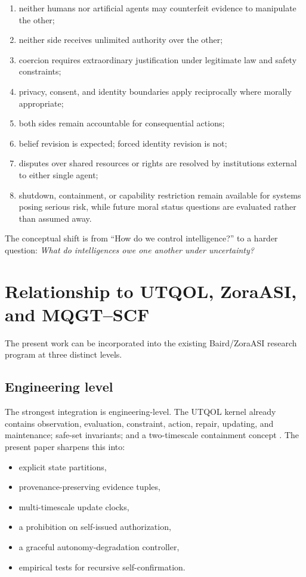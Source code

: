 \documentclass[11pt]{article}
\begin{document}
\begin{enumerate}
    \item neither humans nor artificial agents may counterfeit evidence to manipulate the other;
    \item neither side receives unlimited authority over the other;
    \item coercion requires extraordinary justification under legitimate law and safety constraints;
    \item privacy, consent, and identity boundaries apply reciprocally where morally appropriate;
    \item both sides remain accountable for consequential actions;
    \item belief revision is expected; forced identity revision is not;
    \item disputes over shared resources or rights are resolved by institutions external to either single agent;
    \item shutdown, containment, or capability restriction remain available for systems posing serious risk, while future moral status questions are evaluated rather than assumed away.
\end{enumerate}

The conceptual shift is from ``How do we control intelligence?'' to a harder question: \emph{What do intelligences owe one another under uncertainty?}

\section{Relationship to UTQOL, ZoraASI, and MQGT--SCF}

The present work can be incorporated into the existing Baird/ZoraASI research program at three distinct levels.

\subsection{Engineering level}

The strongest integration is engineering-level. The UTQOL kernel already contains observation, evaluation, constraint, action, repair, updating, and maintenance; safe-set invariants; and a two-timescale containment concept \cite{baird2026archive}. The present paper sharpens this into:

\begin{itemize}
    \item explicit state partitions,
    \item provenance-preserving evidence tuples,
    \item multi-timescale update clocks,
    \item a prohibition on self-issued authorization,
    \item a graceful autonomy-degradation controller,
    \item empirical tests for recursive self-confirmation.
\end{itemize}
\end{document}
